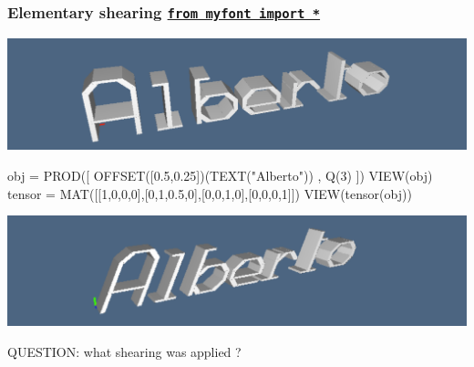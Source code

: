 \documentclass{beamer}
\begin{document}
\begin{frame}[fragile]
\frametitle{Elementary shearing \hfill\scriptsize  \href{http://www.dia.uniroma3.it/~paoluzzi/web/did/graficacomp/2014/notes/myfont.py}{\tt from myfont import *}}\small

\centering\includegraphics[width=0.8\linewidth]{figs/alberto0a}

\begin{python}
obj = PROD([  OFFSET([0.5,0.25])(TEXT("Alberto")) , Q(3) ])
VIEW(obj)
tensor = MAT([[1,0,0,0],[0,1,0.5,0],[0,0,1,0],[0,0,0,1]])
VIEW(tensor(obj))
\end{python}

\vfill
\centering\includegraphics[width=0.8\linewidth]{figs/alberto1a}

\vfill\flushleft

QUESTION:	what shearing was applied ?

\end{frame}
\end{document}
